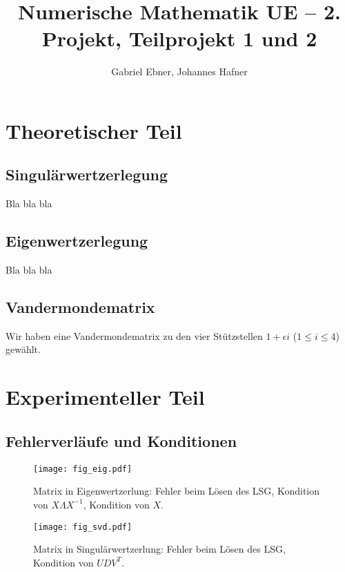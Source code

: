 \documentclass{scrartcl}
\begin{document}
\title{Numerische Mathematik UE -- 2. Projekt, Teilprojekt 1 und 2}
\author{Gabriel Ebner, Johannes Hafner}
\maketitle

\section{Theoretischer Teil}

\subsection{Singulärwertzerlegung}

Bla bla bla

\subsection{Eigenwertzerlegung}

Bla bla bla

\subsection{Vandermondematrix}

Wir haben eine Vandermondematrix zu den vier Stützstellen \(1 + \epsilon i\)
(\(1 \leq i \leq 4\)) gewählt.

\section{Experimenteller Teil}

\subsection{Fehlerverläufe und Konditionen}

\begin{figure}[!htb]
\centering
\texttt{[image: fig\_eig.pdf]}
\caption{Matrix in Eigenwertzerlung: Fehler beim Lösen des LSG, Kondition von \(X \Lambda X^{-1}\), Kondition von \(X\). }
\label{fig:eig}
\end{figure}

\begin{figure}[!htb]
\centering
\texttt{[image: fig\_svd.pdf]}
\caption{Matrix in Singulärwertzerlung: Fehler beim Lösen des LSG, Kondition von \(UDV^T\). }
\label{fig:svd}
\end{figure}
\end{document}
